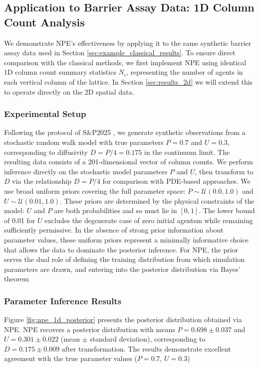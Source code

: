\documentclass{article}
\newcommand{\SP}{S\&P2025 }
\begin{document}
\subsection{Application to Barrier Assay Data: 1D Column Count Analysis} \label{sec:1d_results}

We demonstrate NPE's effectiveness by applying it to the same synthetic barrier assay data used in Section \ref{sec:example_classical_results}. To ensure direct comparison with the classical methods, we first implement NPE using identical 1D column count summary statistics $N_i$, representing the number of agents in each vertical column of the lattice. In Section \ref{sec:results_2d} we will extend this to operate directly on the 2D spatial data.

\subsubsection{Experimental Setup}
Following the protocol of \SP, we generate synthetic observations from a stochastic random walk model with true parameters $P = 0.7$ and $U = 0.3$, corresponding to diffusivity $D = P/4 = 0.175$ in the continuum limit. The resulting data consists of a 201-dimensional vector of column counts. We perform inference directly on the stochastic model parameters $P$ and $U$, then transform to $D$ via the relationship $D = P/4$ for comparison with PDE-based approaches. We use  broad uniform priors covering the full parameter space: $P \sim \mathcal{U}(0.0, 1.0)$ and $U \sim \mathcal{U}(0.01, 1.0)$. These priors are determined by the physical constraints of the model: $U$ and $P$ are both probabilities and so must lie in $[0,1]$. The lower bound of 0.01 for $U$ excludes the degenerate case of zero initial agentsm while remaining sufficiently permissive. In the absence of strong prior information about parameter values, these uniform priors represent a minimally informative choice that allows the data to dominate the posterior inference. For NPE, the prior serves the dual role of defining the training distribution from which simulation parameters are drawn, and entering into the posterior distribution via Bayes' theorem \citep{Gelman1995,Gelman2017}







\subsubsection{Parameter Inference Results}
Figure \ref{fig:npe_1d_posterior} presents the posterior distribution obtained via NPE. NPE recovers a posterior distribution with means $P = 0.698 \pm 0.037$ and $U = 0.301 \pm 0.022$ (mean $\pm$ standard deviation), corresponding to $D = 0.175 \pm 0.009$ after transformation. The results demonstrate excellent agreement with the true parameter values ($P = 0.7$, $U = 0.3$) 
\end{document}
